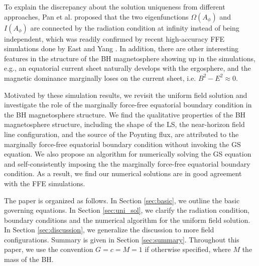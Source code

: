 \documentclass[aps,prd,reprint,nofootinbib, superscriptaddress]{revtex4-1}
\def\Ap{A_\phi}
\begin{document}
To explain the discrepancy about the solution uniqueness from different approaches, Pan et al.  \cite{Pan2017}
proposed that the two eigenfunctions $\Omega(\Ap)$ and $I(\Ap)$ are connected by the radiation condition at infinity instead of
being independent, which was readily confirmed by recent high-accuracy FFE simulations done
by East and Yang \cite{East2018}. In addition, there are other interesting features in the structure of the BH
magnetosphere showing up in the simulations, e.g., an equatorial current sheet naturally develops
with the ergosphere, and the magnetic dominance marginally loses on the current sheet, i.e. $B^2-E^2\approx 0$.

Motivated by these simulation results, we revisit the uniform field solution and investigate the role of the
marginally force-free equatorial boundary condition in the BH magnetosphere structure.
We find the qualitative properties of the BH magnetosphere structure, including the shape of the LS,
the near-horizon field line configuration, and the source of the Poynting flux, are attributed to the marginally
force-free equatorial boundary condition without invoking the GS equation.
We also  propose an algorithm for numerically solving the GS equation and
self-consistently imposing the the marginally force-free equatorial boundary condition.
As a result, we find our numerical solutions are in good agreement with the FFE simulations.


The paper is organized as follows.  In Section \ref{sec:basic}, we outline the basic governing equations.
In Section \ref{sec:uni_sol}, we clarify the radiation condition, boundary conditions and the numerical algorithm
for the uniform field solution. In Section \ref{sec:discussion}, we generalize the discussion
to  more field configurations. Summary is given in Section \ref{sec:summary}.
Throughout this paper, we use the convention $G=c=M=1$ if otherwise specified,
where $M$ the mass of the BH.
\end{document}
